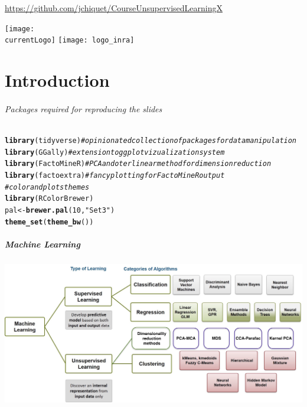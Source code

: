 \documentclass{beamer}\usepackage[]{graphicx}\usepackage[]{color}
\title{\currentCourse}
\subtitle{\huge\currentChapter\normalsize}
\institute{\currentInstitute}
\date{\currentDate}
\makeatletter
\newcommand{\hlnum}[1]{\textcolor[rgb]{0.686,0.059,0.569}{#1}}%
\newcommand{\hlstr}[1]{\textcolor[rgb]{0.192,0.494,0.8}{#1}}%
\newcommand{\hlcom}[1]{\textcolor[rgb]{0.678,0.584,0.686}{\textit{#1}}}%
\newcommand{\hlstd}[1]{\textcolor[rgb]{0.345,0.345,0.345}{#1}}%
\newcommand{\hlkwb}[1]{\textcolor[rgb]{0.69,0.353,0.396}{#1}}%
\newcommand{\hlkwd}[1]{\textcolor[rgb]{0.737,0.353,0.396}{\textbf{#1}}}%
\newenvironment{kframe}{%
 \def\at@end@of@kframe{}%
 \ifinner\ifhmode%
  \def\at@end@of@kframe{\end{minipage}}%
  \begin{minipage}{\columnwidth}%
 \fi\fi%
 \def\FrameCommand##1{\hskip\@totalleftmargin \hskip-\fboxsep
 \colorbox{shadecolor}{##1}\hskip-\fboxsep
     \hskip-\linewidth \hskip-\@totalleftmargin \hskip\columnwidth}%
 \MakeFramed {\advance\hsize-\width
   \@totalleftmargin\z@ \linewidth\hsize
   \@setminipage}}%
 {\par\unskip\endMakeFramed%
 \at@end@of@kframe}
\newenvironment{knitrout}{}{} %
\def\currentLogo{../common_figs/logo_X}
\newcommand{\dotitlepage}{%
  \begin{frame}
    \titlepage
    \vfill
    \begin{center}
        \scriptsize\url{https://github.com/jchiquet/CourseUnsupervisedLearningX}
    \end{center}
    \vfill
    \texttt{[image: \\currentLogo]}\hfill
    \texttt{[image: logo\_inra]}
  \end{frame}
}
\makeatother
\begin{document}
\dotitlepage

\part{Introduction}

\begin{frame}[fragile]
  \partpage

\paragraph{Packages required for reproducing the slides}
\begin{knitrout}\scriptsize
{}\color{fgcolor}\begin{kframe}
\begin{alltt}
\hlkwd{library}\hlstd{(tidyverse)}  \hlcom{# opinionated collection of packages for data manipulation}
\hlkwd{library}\hlstd{(GGally)}     \hlcom{# extension to ggplot vizualization system}
\hlkwd{library}\hlstd{(FactoMineR)} \hlcom{# PCA and oter linear method for dimension reduction}
\hlkwd{library}\hlstd{(factoextra)} \hlcom{# fancy plotting for FactoMineR output}
\hlcom{# color and plots themes}
\hlkwd{library}\hlstd{(RColorBrewer)}
\hlstd{pal} \hlkwb{<-} \hlkwd{brewer.pal}\hlstd{(}\hlnum{10}\hlstd{,} \hlstr{"Set3"}\hlstd{)}
\hlkwd{theme_set}\hlstd{(}\hlkwd{theme_bw}\hlstd{())}
\end{alltt}
\end{kframe}
\end{knitrout}

\end{frame}

\begin{frame}
	\frametitle{Machine Learning}

	\begin{center}
		\includegraphics[width=\textwidth]{Learning+Types}
	\end{center}

\end{frame}
\end{document}
